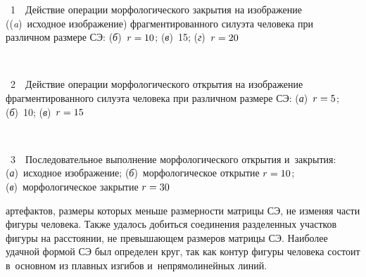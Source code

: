 \begin{multicols}{2}
\noindent
{{\figurename~1}\ \ \small{Действие операции морфологического закрытия на изображение
((\textit{a})~исходное
изображение) фрагментированного силуэта человека при различном размере СЭ: 
 (\textit{б})~$r\hm= 10$; (\textit{в})~15; (\textit{г})~$r\hm=20$}}
 
 \vspace*{12pt}


\begin{center}  %
\vspace*{-1pt}
 \mbox{%
 \epsfxsize=54.821mm
 }

\end{center}


\noindent
{{\figurename~2}\ \ \small{Действие операции морфологического открытия на изображение
фрагментированного силуэта человека при различном размере СЭ: (\textit{а})~$r\hm= 5$; 
(\textit{б})~10; (\textit{в})~$r\hm=15$}}

 \vspace*{12pt}

\begin{center}  %
\vspace*{-1pt}
  \mbox{%
 \epsfxsize=78mm
 }

\end{center}


\noindent
{{\figurename~3}\ \ \small{Последовательное выполнение морфологического открытия и~закрытия:
(\textit{а})~исходное изображение; (\textit{б})~морфологическое открытие $r\hm = 10$;
(\textit{в})~морфологическое закрытие $r\hm = 30$}}





\vspace*{18pt}


\addtocounter{figure}{3}




\noindent
артефактов, размеры которых меньше размерности матрицы СЭ, не изменяя
части фигуры человека. Также удалось добиться соединения разделенных
участков фигуры на расстоянии, не превышающем размеров матрицы СЭ.
Наиболее удачной формой СЭ был определен круг, так как контур фигуры
человека состоит в~основном из плавных изгибов и~непрямолинейных линий.


\end{multicols}
